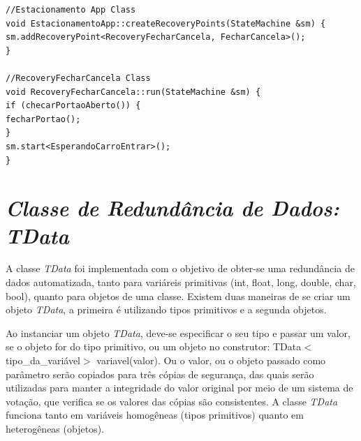 \begin{lstlisting}[label=Func:addRecoveryPoint,caption={[Métodos \textit{createRecoveryPoints} e \textit{run}]Este quadro demonstra a implementação do método \textit{createRecoveryPoints} implementado no EstacionamentoApp que herda de \textit{Application}. O ponto de recuperação é criado quando o método \textit{addRecoveryPoint} é evocado, percebe-se que existem duas classes separadas por vírgula e entre $<$$>$, a primeira é a implementação do ponto de recuperação, ou seja, a classe que herda de \textit{RecoveryPoints}. A segunda é a classe que representa o estado que deverá ser executado após a reinicialização do microcontrolador, ou seja, caso ele inicie neste ponto de recuperação o estado EsperandoCarroEntrar deverá ser escutado. No método \textit{run} da classe RecoveryEsperandoCarroEntrar encontra-se o código que será executado caso o microncontrolador falhe no momento em que o carro iria entrar no estacionamento. Pois se a energia acabar neste momento, quando o firmware for executado novamento, o ponto de recuperação verificará se o portão está fechado, caso sim, o portão será aberto e a máquina de estados será iniciada novamente a partir do estado EsperandoCarroEntrar, caso não, o portão continuará aberto e máquina de estados será executada novamente.}]
//Estacionamento App Class
void EstacionamentoApp::createRecoveryPoints(StateMachine &sm) {
sm.addRecoveryPoint<RecoveryFecharCancela, FecharCancela>();
}

//RecoveryFecharCancela Class
void RecoveryFecharCancela::run(StateMachine &sm) {
if (checarPortaoAberto()) {
fecharPortao();
}
sm.start<EsperandoCarroEntrar>();
}
\end{lstlisting}

\section{\textit{Classe de Redundância de Dados: TData}} \label{sec:classeTData}
A classe \textit{TData} foi implementada com o objetivo de obter-se uma redundância de dados automatizada, tanto para variáreis primitivas (int, float, long, double, char, bool), quanto para objetos de uma classe. Existem duas maneiras de se criar um objeto \textit{TData}, a primeira é utilizando tipos primitivos e a segunda objetos. 

Ao instanciar um objeto \textit{TData}, deve-se especificar o seu tipo e passar um valor, se o objeto for do tipo primitivo, ou um objeto no construtor: TData$<$tipo\_da\_variável$>$ variavel(valor). Ou o valor, ou o objeto passado como parâmetro serão copiados para três cópias de segurança, das quais serão utilizadas para manter a integridade do valor original por meio de um sistema de votação, que verifica se os valores das cópias são consistentes. A classe \textit{TData} funciona tanto em variáveis homogêneas (tipos primitivos) quanto em heterogêneas (objetos).

